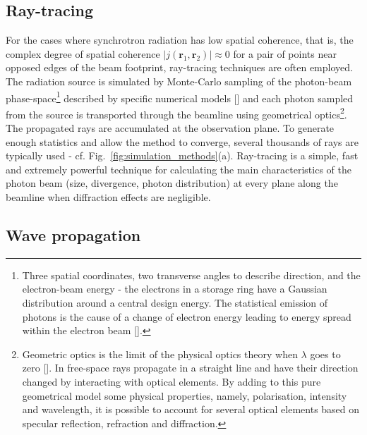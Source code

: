 \begin{refsection}
\subsection{Ray-tracing}\label{sec:ray_tracing}
 For the cases where synchrotron radiation has low spatial coherence, that is, the complex degree of spatial coherence $|j(\textbf{r}_1,\textbf{r}_2)|\approx0$ for a pair of points near opposed edges of the beam footprint, ray-tracing techniques are often employed. The radiation source is simulated by Monte-Carlo sampling of the photon-beam phase-space\footnote{Three spatial coordinates, two transverse angles to describe direction, and the electron-beam energy - the electrons in a storage ring have a Gaussian distribution around a central design energy. The statistical emission of photons is the cause of a change of electron energy leading to energy spread within the electron beam [\cite[\textit{8.3.1}]{Wiedemann2015}].} described by specific numerical models [\cite{Canestrari2013}] and each photon sampled from the source is transported through the beamline using geometrical optics\footnote{Geometric optics is the limit of the physical optics theory when $\lambda$ goes to zero [\cite[\textit{§1.3.C} \& \textit{§2.3}]{Saleh2019}]. In free-space rays propagate in a straight line and have their direction changed by interacting with optical elements. By adding to this pure geometrical model some physical properties, namely, polarisation, intensity and wavelength, it is possible to account for several optical elements based on specular reflection, refraction and diffraction.}. The propagated rays are accumulated at the observation plane. To generate enough statistics and allow the method to converge, several thousands of rays are typically used - cf. Fig.~\ref{fig:simulation_methods}(a). Ray-tracing is a simple, fast and extremely powerful technique for calculating the main characteristics of the photon beam (size, divergence, photon distribution) at every plane along the beamline when diffraction effects are negligible.

\subsection{Wave propagation}\label{sec:wave_propag}


\end{refsection}
